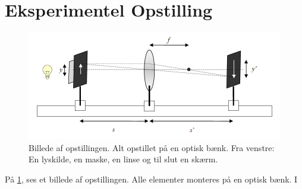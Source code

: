 \section{Eksperimentel Opstilling}
\begin{figure}[H]
    \includegraphics[width=\linewidth]{tegning.png}
    \caption{Billede af opstillingen. Alt opstillet på en optisk bænk. Fra venstre: En lyskilde, en maske, en linse  og til slut en skærm.}
    \label{fig:opstilling}
\end{figure}
På \cref{fig:opstilling}, ses et billede af opstillingen. Alle elementer monteres på en optisk bænk. I %
